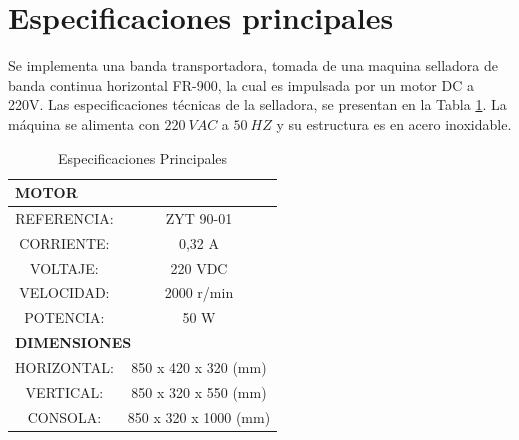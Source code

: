 	\section{Especificaciones principales}
		Se implementa una banda transportadora, tomada de una maquina selladora de banda continua horizontal FR-900, la cual es impulsada por un motor DC a 220V. Las especificaciones técnicas de la selladora, se presentan en la Tabla \ref{fig:principales}. La máquina se alimenta con $220 \ VAC$ a $50 \ HZ$ y su estructura es en acero inoxidable. 
		
		\begin{table}[ht]
			\centering
			\begin{tabular}{|c|c|c|c|}
				\hline
				\multicolumn{4}{|l|}{\textbf{MOTOR}} \bigstrut\\
				\hline
				\multicolumn{2}{|c|}{REFERENCIA:} & \multicolumn{2}{c|}{ZYT 90-01} \bigstrut\\
				\hline
				\multicolumn{2}{|c|}{CORRIENTE:} & \multicolumn{2}{c|}{0,32 A} \bigstrut\\
				\hline
				\multicolumn{2}{|c|}{VOLTAJE:} & \multicolumn{2}{c|}{220 VDC} \bigstrut\\
				\hline
				\multicolumn{2}{|c|}{VELOCIDAD:} & \multicolumn{2}{c|}{2000 r/min} \bigstrut\\
				\hline
				\multicolumn{2}{|c|}{POTENCIA:} & \multicolumn{2}{c|}{50 W} \bigstrut\\
				\hline
				\multicolumn{4}{|l|}{\textbf{DIMENSIONES}} \bigstrut\\
				\hline
				\multicolumn{2}{|c|}{HORIZONTAL:} & \multicolumn{2}{c|}{850 x 420 x 320 (mm)} \bigstrut\\
				\hline
				\multicolumn{2}{|c|}{VERTICAL:} & \multicolumn{2}{c|}{850 x 320 x 550 (mm)} \bigstrut\\
				\hline
				\multicolumn{2}{|c|}{CONSOLA:} & \multicolumn{2}{c|}{850 x 320 x 1000 (mm)} \bigstrut\\
				\hline
			\end{tabular}%
			\caption{Especificaciones Principales}
			\label{fig:principales}
		\end{table}%
		
	
	\newpage

